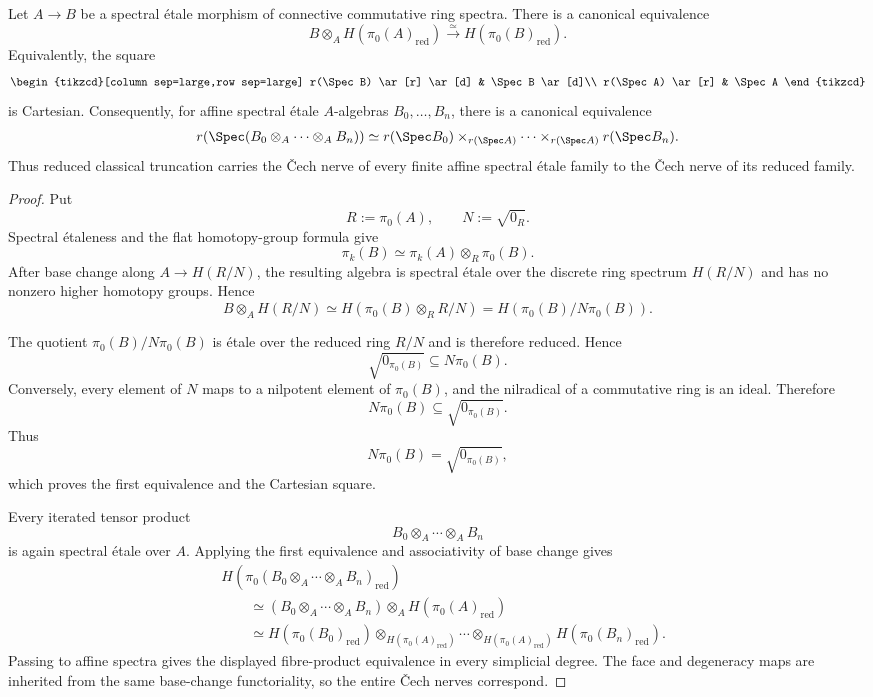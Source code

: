 \begin{lemma}
\label{lem:infinitesimal-reduction-cech}
Let $A\to B$ be a spectral \'etale morphism of connective commutative ring
spectra.  There is a canonical equivalence
\[
    B\otimes_AH(\pi_0(A)_{\mathrm{red}})
    \xrightarrow{\simeq}
    H(\pi_0(B)_{\mathrm{red}}).
\]
Equivalently, the square
\[
\begin{tikzcd}[column sep=large,row sep=large]
    r(\Spec B) \ar[r] \ar[d]
        & \Spec B \ar[d]\\
    r(\Spec A) \ar[r]
        & \Spec A
\end{tikzcd}
\]
is Cartesian.  Consequently, for affine spectral \'etale $A$-algebras
$B_0,\ldots,B_n$, there is a canonical equivalence
\[
\begin{aligned}
    r\!\left(
        \Spec(B_0\otimes_A\cdots\otimes_AB_n)
    \right)
    \simeq
    r(\Spec B_0)
    \times_{r(\Spec A)}
    \cdots
    \times_{r(\Spec A)}
    r(\Spec B_n).
\end{aligned}
\]
Thus reduced classical truncation carries the \v{C}ech nerve of every finite
affine spectral \'etale family to the \v{C}ech nerve of its reduced family.
\end{lemma}

\begin{proof}
Put
\[
    R:=\pi_0(A),
    \qquad
    N:=\sqrt{0_R}.
\]
Spectral \'etaleness and the flat homotopy-group formula give
\[
    \pi_k(B)
    \simeq
    \pi_k(A)\otimes_R\pi_0(B).
\]
After base change along $A\to H(R/N)$, the resulting algebra is spectral
\'etale over the discrete ring spectrum $H(R/N)$ and has no nonzero higher
homotopy groups.  Hence
\[
    B\otimes_AH(R/N)
    \simeq
    H\!\left(\pi_0(B)\otimes_RR/N\right)
    =
    H\!\left(\pi_0(B)/N\pi_0(B)\right).
\]

The quotient $\pi_0(B)/N\pi_0(B)$ is \'etale over the reduced ring $R/N$ and
is therefore reduced.  Hence
\[
    \sqrt{0_{\pi_0(B)}}\subseteq N\pi_0(B).
\]
Conversely, every element of $N$ maps to a nilpotent element of $\pi_0(B)$,
and the nilradical of a commutative ring is an ideal.  Therefore
\[
    N\pi_0(B)\subseteq\sqrt{0_{\pi_0(B)}}.
\]
Thus
\[
    N\pi_0(B)=\sqrt{0_{\pi_0(B)}},
\]
which proves the first equivalence and the Cartesian square.

Every iterated tensor product
\[
    B_0\otimes_A\cdots\otimes_AB_n
\]
is again spectral \'etale over $A$.  Applying the first equivalence and
associativity of base change gives
\[
\begin{aligned}
&H(\pi_0(B_0\otimes_A\cdots\otimes_AB_n)_{\mathrm{red}})\\
&\qquad\simeq
(B_0\otimes_A\cdots\otimes_AB_n)
\otimes_AH(\pi_0(A)_{\mathrm{red}})\\
&\qquad\simeq
H(\pi_0(B_0)_{\mathrm{red}})
\otimes_{H(\pi_0(A)_{\mathrm{red}})}
\cdots
\otimes_{H(\pi_0(A)_{\mathrm{red}})}
H(\pi_0(B_n)_{\mathrm{red}}).
\end{aligned}
\]
Passing to affine spectra gives the displayed fibre-product equivalence in
every simplicial degree.  The face and degeneracy maps are inherited from
the same base-change functoriality, so the entire \v{C}ech nerves correspond.
\end{proof}

